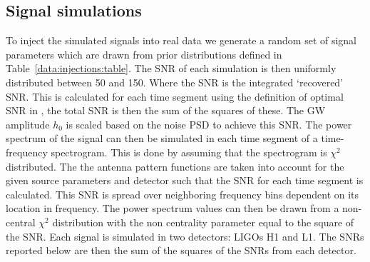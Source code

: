 \subsection{\label{machine:data:injections} Signal simulations}

%
To inject the simulated signals into real data we generate a random set of signal
parameters which are drawn from prior distributions defined in
Table~\ref{data:injections:table}. The \gls{SNR} of each simulation is then uniformly distributed between 50 and 150. Where the \gls{SNR} is the integrated `recovered' \gls{SNR}. This is calculated for each time segment using the definition of optimal \gls{SNR} in \cite{prix2007SearchContinuous}, the total \gls{SNR} is then the sum of the squares of these.
The \gls{GW} amplitude $h_{0}$ is scaled based on the noise \gls{PSD} to achieve this \gls{SNR}. 
The power spectrum of the signal can then be simulated in each time segment of a time-frequency spectrogram. This is done by assuming that the spectrogram is $\chi^2$ distributed.
The the antenna pattern functions are taken into account for the given source parameters and detector such that the \gls{SNR} for each time segment is calculated.
This \gls{SNR} is spread over neighboring frequency bins dependent on its location in frequency.
The power spectrum values can then be drawn from a non-central $\chi^2$ distribution with the non centrality parameter equal to the square of the \gls{SNR}.
Each signal is simulated in two detectors: \glspl{LIGO} H1 and L1.
The \glspl{SNR} reported below are then the sum of the squares of the \glspl{SNR} from each detector.



